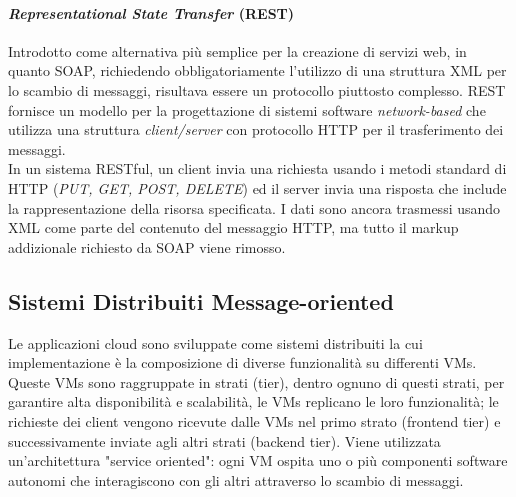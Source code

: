 \documentclass{article}
\begin{document}
\paragraph{\textit{Representational State Transfer} (REST)}
Introdotto come alternativa più semplice per la creazione di servizi web, in quanto SOAP, richiedendo obbligatoriamente l'utilizzo di una struttura XML per lo scambio di messaggi, risultava essere un protocollo piuttosto complesso.
REST fornisce un modello per la progettazione di sistemi software \textit{network-based} che utilizza una struttura \textit{client/server} con protocollo HTTP per il trasferimento dei messaggi. \\
In un sistema RESTful, un client invia una richiesta usando i metodi standard di HTTP (\textit{PUT, GET, POST, DELETE}) ed il server invia una risposta che include la rappresentazione della risorsa specificata.
I dati sono ancora trasmessi usando XML come parte del contenuto del messaggio HTTP, ma tutto il markup addizionale richiesto da SOAP viene rimosso.


\subsection{Sistemi Distribuiti Message-oriented}
Le applicazioni cloud sono sviluppate come sistemi distribuiti la cui implementazione è la composizione di diverse funzionalità su differenti VMs. Queste VMs sono raggruppate in strati (tier), dentro ognuno di questi strati, per garantire alta disponibilità e scalabilità, le VMs replicano le loro funzionalità; le richieste dei client vengono ricevute dalle VMs nel primo strato (frontend tier) e successivamente inviate agli altri strati (backend tier). 
Viene utilizzata un'architettura "service oriented": ogni VM ospita uno o più componenti software autonomi che interagiscono con gli altri attraverso lo scambio di messaggi.
\end{document}
